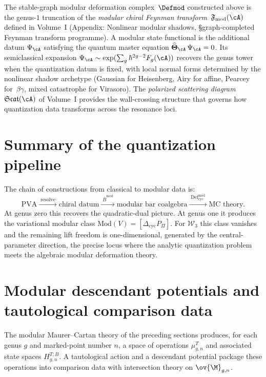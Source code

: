 \begin{remark}
\label{rem:modular-state-functional-connection}
The stable-graph modular deformation complex~$\Defmod$ constructed above
is the genus-$1$ truncation of the \emph{modular chiral Feynman
transform}~$\mathfrak{F}_{\mathrm{mod}}(\cA)$ defined in
Volume~I (Appendix: Nonlinear modular shadows,
\S\textup{graph-completed Feynman transform programme}).
A modular state functional is the additional datum
$\Psi_\cA$ satisfying the quantum master equation
$\widehat{\boldsymbol\Theta}_\cA\,\Psi_\cA=0$. Its semiclassical
expansion
$\Psi_\cA \sim \exp(\sum_{g} \hbar^{2g-2} F_g(\cA))$
recovers the genus tower when the quantization datum is fixed, with local
normal forms determined by the nonlinear shadow archetype (Gaussian for
Heisenberg, Airy for affine, Pearcey for~$\beta\gamma$, mixed catastrophe
for Virasoro).
The \emph{polarized scattering diagram}~$\mathfrak{Scat}(\cA)$ of
Volume~I provides the wall-crossing structure that governs how
quantization data transforms across the resonance loci.
\end{remark}

\section*{Summary of the quantization pipeline}

The chain of constructions from classical to modular data is:
\[
\text{PVA}
\xrightarrow{\;\text{resolve}\;}
\text{chiral datum}
\xrightarrow{\;\overline{B}^{\mathrm{mod}}\;}
\text{modular bar coalgebra}
\xrightarrow{\;\mathrm{Def}_{\mathrm{cyc}}^{\mathrm{mod}}\;}
\text{MC theory}.
\]
At genus zero this recovers the quadratic-dual picture. At genus one it produces the
variational modular class $\mathrm{Mod}(V) = [\Delta_{\mathrm{cyc}} P_\Pi]$.
For $\mathcal{W}_3$ this class vanishes and the remaining lift freedom is one-dimensional,
generated by the central-parameter direction, the precise locus where the analytic
quantization problem meets the algebraic modular deformation theory.

\section{Modular descendant potentials and tautological comparison data}
\label{sec:modular-descendant-potentials}

The modular Maurer--Cartan theory of the preceding sections produces, for each genus $g$
and marked-point number $n$, a space of operations $\mu_{g,n}^T$ and associated state
spaces $H_{g,n}^{T;B}$. A tautological action and a descendant potential package these
operations into comparison data with intersection theory on $\ov{\M}_{g,n}$.

